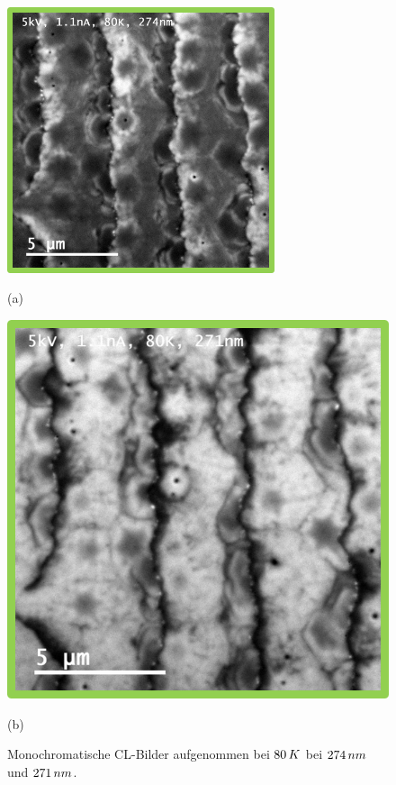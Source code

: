 \begin{figure}[H]
  \centering
  \begin{minipage}[t]{0.49\textwidth}
    \centering
    \includegraphics[width=0.7\textwidth]{Bilder/TS4048/cSLELOmonocllow.png}
		\caption{(a)}
  \end{minipage}
	\hfill
  \begin{minipage}[t]{0.49\textwidth}
    \centering
    \includegraphics[width=0.7\linewidth]{Bilder/TS4048/cSLELOmonoclpeak.png}
		\caption{(b)}
  \end{minipage}
	\caption{Monochromatische CL-Bilder aufgenommen bei $80 \thinspace K$ bei $274 \thinspace nm$ und $271 \thinspace nm$. }
	\label{fig:monoclgesamt}
\end{figure}
\noindent 
